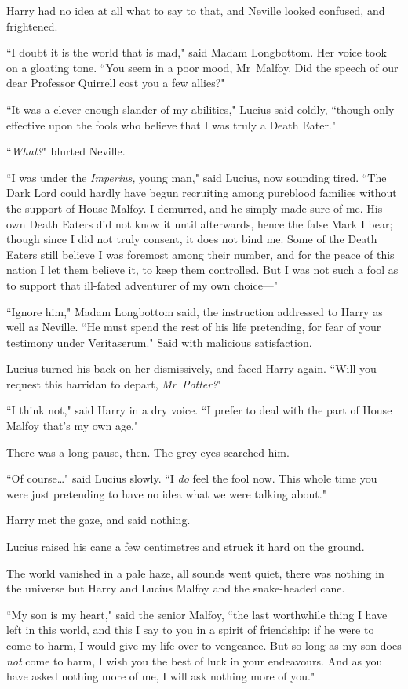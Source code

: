 Harry had no idea at all what to say to that, and Neville looked confused, and frightened.

``I doubt it is the world that is mad," said Madam Longbottom. Her voice took on a gloating tone. ``You seem in a poor mood, Mr~Malfoy. Did the speech of our dear Professor Quirrell cost you a few allies?"

``It was a clever enough slander of my abilities," Lucius said coldly, ``though only effective upon the fools who believe that I was truly a Death Eater."

``\emph{What?}" blurted Neville.

``I was under the \emph{Imperius,} young man," said Lucius, now sounding tired. ``The Dark Lord could hardly have begun recruiting among pureblood families without the support of House Malfoy. I demurred, and he simply made sure of me. His own Death Eaters did not know it until afterwards, hence the false Mark I bear; though since I did not truly consent, it does not bind me. Some of the Death Eaters still believe I was foremost among their number, and for the peace of this nation I let them believe it, to keep them controlled. But I was not such a fool as to support that ill-fated adventurer of my own choice—"

``Ignore him," Madam Longbottom said, the instruction addressed to Harry as well as Neville. ``He must spend the rest of his life pretending, for fear of your testimony under Veritaserum." Said with malicious satisfaction.

Lucius turned his back on her dismissively, and faced Harry again. ``Will you request this harridan to depart, \emph{Mr~Potter?}"

``I think not," said Harry in a dry voice. ``I prefer to deal with the part of House Malfoy that's my own age."

There was a long pause, then. The grey eyes searched him.

``Of course{\ldots}" said Lucius slowly. ``I \emph{do} feel the fool now. This whole time you were just pretending to have no idea what we were talking about."

Harry met the gaze, and said nothing.

Lucius raised his cane a few centimetres and struck it hard on the ground.

The world vanished in a pale haze, all sounds went quiet, there was nothing in the universe but Harry and Lucius Malfoy and the snake-headed cane.

``My son is my heart," said the senior Malfoy, ``the last worthwhile thing I have left in this world, and this I say to you in a spirit of friendship: if he were to come to harm, I would give my life over to vengeance. But so long as my son does \emph{not} come to harm, I wish you the best of luck in your endeavours. And as you have asked nothing more of me, I will ask nothing more of you."

